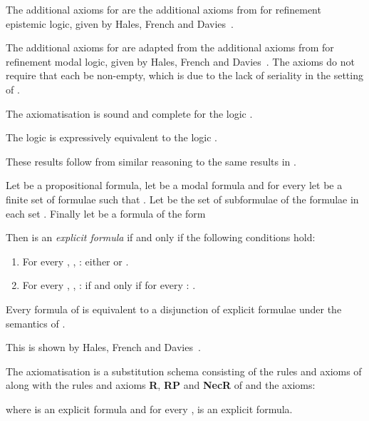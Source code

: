 \documentclass[twoside]{aiml14}
\begin{document}
  The additional axioms for \axiomAamlKFF{} are the additional axioms from \axiomRmlKFF{} for refinement epistemic logic, given by Hales, French and Davies~\cite{hales2012}.
  
  The additional axioms for \axiomAamlKFF{} are adapted from the additional
  axioms from \axiomRmlKD{} for refinement modal logic, given by Hales, French
  and Davies~\cite{hales2012}. The axioms do not require that each
   be non-empty, which is due to the lack of seriality in the
  setting of \classKFF{}.

  \begin{proposition}
      The axiomatisation \axiomAamlKFF{} is sound and complete for the logic \logicAamlKFF{}.
  \end{proposition}

  \begin{proposition}
      The logic \logicAamlKFF{} is expressively equivalent to the logic \logicKFF{}.
  \end{proposition}

  These results follow from similar reasoning to the same results in \logicAamlK{}.

  \begin{definition}\label{explicit}
      Let  be a propositional formula,
      let  be a modal formula
      and for every  
      let  
      be a finite set of formulae such that .
      Let 
      be the set of subformulae of the formulae in each set .
      Finally let  be a formula of the form
      
      Then  is an {\em explicit formula} if and only if the following conditions hold:

      \begin{enumerate}
          \item For every , , : 
              either  or .
          \item For every , , : 
               if and only if 
              for every : .
      \end{enumerate}
  \end{definition}

  \begin{proposition}
      Every formula of \lang{} is equivalent to a disjunction of explicit
      formulae under the semantics of \logicS{}.
  \end{proposition}

  This is shown by Hales, French and Davies~\cite{hales2012}.

  \begin{definition}
      The axiomatisation \axiomAmlS{} is a substitution schema consisting of
      the rules and axioms of \axiomAmlS{} along with the rules and axioms
      {\bf R}, {\bf RP} and {\bf NecR} of \axiomAamlK{} and the axioms:
      
      where  is an explicit formula
      and for every ,  is an explicit formula.
  \end{definition}
\end{document}
